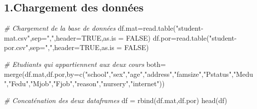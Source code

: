 \documentclass[
]{article}
\newenvironment{Shaded}{\begin{snugshade}}{\end{snugshade}}
\newcommand{\AttributeTok}[1]{\textcolor[rgb]{0.77,0.63,0.00}{#1}}
\newcommand{\CommentTok}[1]{\textcolor[rgb]{0.56,0.35,0.01}{\textit{#1}}}
\newcommand{\ConstantTok}[1]{\textcolor[rgb]{0.00,0.00,0.00}{#1}}
\newcommand{\FunctionTok}[1]{\textcolor[rgb]{0.00,0.00,0.00}{#1}}
\newcommand{\NormalTok}[1]{#1}
\newcommand{\OtherTok}[1]{\textcolor[rgb]{0.56,0.35,0.01}{#1}}
\newcommand{\StringTok}[1]{\textcolor[rgb]{0.31,0.60,0.02}{#1}}
\begin{document}
\hypertarget{chargement-des-donnuxe9es}{%
\subsection{1.Chargement des données}\label{chargement-des-donnuxe9es}}

\begin{Shaded}
\begin{Highlighting}[]
\CommentTok{\# Chargement de la base de données}
\NormalTok{df.mat}\OtherTok{=}\FunctionTok{read.table}\NormalTok{(}\StringTok{"student{-}mat.csv"}\NormalTok{,}\AttributeTok{sep=}\StringTok{","}\NormalTok{,}\AttributeTok{header=}\ConstantTok{TRUE}\NormalTok{,}\AttributeTok{as.is =} \ConstantTok{FALSE}\NormalTok{)}
\NormalTok{df.por}\OtherTok{=}\FunctionTok{read.table}\NormalTok{(}\StringTok{"student{-}por.csv"}\NormalTok{,}\AttributeTok{sep=}\StringTok{","}\NormalTok{,}\AttributeTok{header=}\ConstantTok{TRUE}\NormalTok{,}\AttributeTok{as.is =} \ConstantTok{FALSE}\NormalTok{)}

\CommentTok{\# Etudiants qui appartiennent aux deux cours}
\NormalTok{both}\OtherTok{=} \FunctionTok{merge}\NormalTok{(df.mat,df.por,}\AttributeTok{by=}\FunctionTok{c}\NormalTok{(}\StringTok{"school"}\NormalTok{,}\StringTok{"sex"}\NormalTok{,}\StringTok{"age"}\NormalTok{,}\StringTok{"address"}\NormalTok{,}\StringTok{"famsize"}\NormalTok{,}\StringTok{"Pstatus"}\NormalTok{,}\StringTok{"Medu"}\NormalTok{,}\StringTok{"Fedu"}\NormalTok{,}\StringTok{"Mjob"}\NormalTok{,}\StringTok{"Fjob"}\NormalTok{,}\StringTok{"reason"}\NormalTok{,}\StringTok{"nursery"}\NormalTok{,}\StringTok{"internet"}\NormalTok{))}

\CommentTok{\# Concaténation des deux dataframes}
\NormalTok{df }\OtherTok{=} \FunctionTok{rbind}\NormalTok{(df.mat,df.por)}
\FunctionTok{head}\NormalTok{(df)}
\end{Highlighting}
\end{Shaded}
\end{document}
